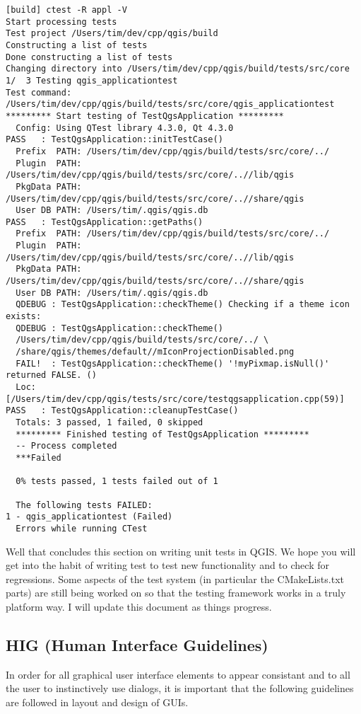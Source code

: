 \begin{verbatim}
[build] ctest -R appl -V
Start processing tests
Test project /Users/tim/dev/cpp/qgis/build
Constructing a list of tests
Done constructing a list of tests
Changing directory into /Users/tim/dev/cpp/qgis/build/tests/src/core
1/  3 Testing qgis_applicationtest          
Test command: /Users/tim/dev/cpp/qgis/build/tests/src/core/qgis_applicationtest
********* Start testing of TestQgsApplication *********
  Config: Using QTest library 4.3.0, Qt 4.3.0
PASS   : TestQgsApplication::initTestCase()
  Prefix  PATH: /Users/tim/dev/cpp/qgis/build/tests/src/core/../
  Plugin  PATH: /Users/tim/dev/cpp/qgis/build/tests/src/core/..//lib/qgis
  PkgData PATH: /Users/tim/dev/cpp/qgis/build/tests/src/core/..//share/qgis
  User DB PATH: /Users/tim/.qgis/qgis.db
PASS   : TestQgsApplication::getPaths()
  Prefix  PATH: /Users/tim/dev/cpp/qgis/build/tests/src/core/../
  Plugin  PATH: /Users/tim/dev/cpp/qgis/build/tests/src/core/..//lib/qgis
  PkgData PATH: /Users/tim/dev/cpp/qgis/build/tests/src/core/..//share/qgis
  User DB PATH: /Users/tim/.qgis/qgis.db
  QDEBUG : TestQgsApplication::checkTheme() Checking if a theme icon exists:
  QDEBUG : TestQgsApplication::checkTheme() 
  /Users/tim/dev/cpp/qgis/build/tests/src/core/../ \
  /share/qgis/themes/default//mIconProjectionDisabled.png
  FAIL!  : TestQgsApplication::checkTheme() '!myPixmap.isNull()' returned FALSE. ()
  Loc: [/Users/tim/dev/cpp/qgis/tests/src/core/testqgsapplication.cpp(59)]
PASS   : TestQgsApplication::cleanupTestCase()
  Totals: 3 passed, 1 failed, 0 skipped
  ********* Finished testing of TestQgsApplication *********
  -- Process completed
  ***Failed

  0% tests passed, 1 tests failed out of 1

  The following tests FAILED:
1 - qgis_applicationtest (Failed)
  Errors while running CTest

\end{verbatim}

Well that concludes this section on writing unit tests in QGIS. We hope you
will get into the habit of writing test to test new functionality and to check
for regressions. Some aspects of the test system (in particular the
CMakeLists.txt parts) are still being worked on so that the testing framework
works in a truly platform way. I will update this document as things
progress.


\subsection{HIG (Human Interface Guidelines)}
In order for all graphical user interface elements to appear consistant and to
all the user to instinctively use dialogs, it is important that the following
guidelines are followed in layout and design of GUIs.

